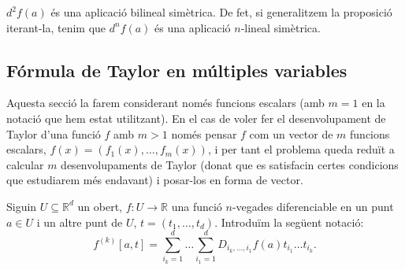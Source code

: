 \documentclass[../Apunts.tex]{subfiles}
\begin{document}
	\begin{corollary}\label{obs:diferencial bilineal}
		\(d^{2}f(a)\) és una aplicació bilineal simètrica. %
		De fet, si generalitzem la proposició iterant-la, tenim que \(d^{n}f(a)\) és una aplicació \(n\)-lineal simètrica.
	\end{corollary}
	\subsection{Fórmula de Taylor en múltiples variables}
	Aquesta secció la farem considerant només funcions escalars (amb \(m=1\) en la notació que hem estat utilitzant). En el cas de voler fer el desenvolupament de Taylor d'una funció \(f\) amb \(m>1\) només pensar \(f\) com un vector de \(m\) funcions escalars, \(f(x)=(f_{1}(x),\dots,f_{m}(x))\), i per tant el problema queda reduït a calcular \(m\) desenvolupaments de Taylor (donat que es satisfacin certes condicions que estudiarem més endavant) i posar-los en forma de vector.
	\begin{notation}
		Siguin \(U\subseteq\mathbb{R}^{d}\) un obert, \(f\colon U\to\mathbb{R}\) una funció \(n\)-vegades diferenciable en un punt \(a\in U\) i un altre punt de \(U\), \(t=(t_{1},\dots,t_{d})\). Introduïm la següent notació:
		\[f^{(k)}[a,t]=\sum_{i_{k}=1}^{d}\dots\sum_{i_{1}=1}^{d}D_{i_{k},\dots,i_{1}}f(a)t_{i_{1}}\dots t_{i_{k}}.\]
	\end{notation}
\end{document}
